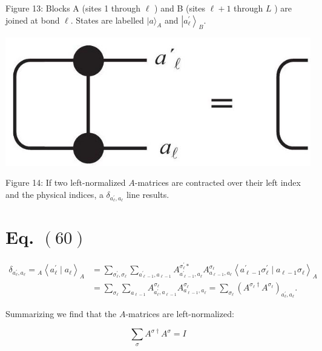 \documentclass[12pt]{article}
\begin{document}
Figure 13: Blocks A (sites 1 through $\ell$ ) and B (sites $\ell+1$ through $L$ ) are joined at bond $\ell$. States are labelled $|a\rangle_{A}$ and $\left|a_{\ell}^{\prime}\right\rangle_{B}$.

\begin{center}
\includegraphics[max width=\textwidth]{2024_05_04_afc4ad226da9ccfe0ac8g-028}
\end{center}

Figure 14: If two left-normalized $A$-matrices are contracted over their left index and the physical indices, a $\delta_{a_{\ell}^{\prime}, a_{\ell}}$ line results.

\section*{Eq. $(60)$}

\begin{align*}
\delta_{a_{\ell}^{\prime}, a_{\ell}}={ }_{A}\left\langle a_{\ell}^{\prime} \mid a_{\ell}\right\rangle_{A} & =\sum_{\sigma_{\ell}^{\prime}, \sigma_{\ell}} \sum_{a_{\ell-1}^{\prime}, a_{\ell-1}} A_{a_{\ell-1}^{\prime}, a_{\ell}}^{\sigma_{\ell}^{\prime} *} A_{a_{\ell-1}, a_{\ell}}^{\sigma_{\ell}}\left\langle a_{\ell-1}^{\prime} \sigma_{\ell}^{\prime} \mid a_{\ell-1} \sigma_{\ell}\right\rangle_{A}  \tag{68}\\
& =\sum_{\sigma_{\ell}} \sum_{a_{\ell-1}} A_{a_{\ell}^{\prime}, a_{\ell-1}}^{\sigma_{\ell}} A_{a_{\ell-1}, a_{\ell}}^{\sigma_{\ell}}=\sum_{\sigma_{\ell}}\left(A^{\sigma_{\ell} \dagger} A^{\sigma_{\ell}}\right)_{a_{\ell}^{\prime}, a_{\ell}} . \tag{69}
\end{align*}


Summarizing we find that the $A$-matrices are left-normalized:


\begin{equation*}
\sum_{\sigma} A^{\sigma \dagger} A^{\sigma}=I \tag{70}
\end{equation*}
\end{document}
